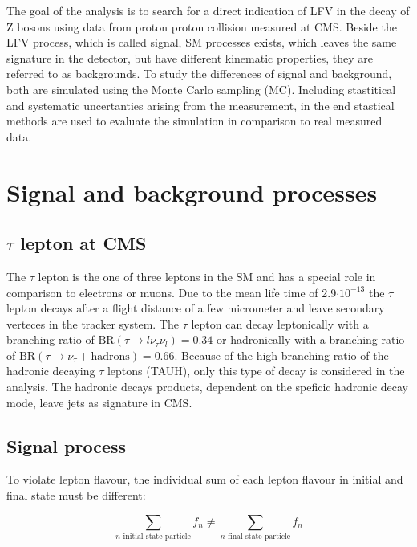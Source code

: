 The goal of the analysis is to search for a direct indication of \gls{LFV} in the decay of Z bosons using data from proton proton collision measured at \gls{CMS}. Beside the \gls{LFV} process, which is called signal, \gls{SM} processes exists, which leaves the same signature in the detector, but have different kinematic properties, they are referred to as backgrounds. To study the differences of signal and background, both are simulated using the Monte Carlo sampling (\gls{MC}). Including stastitical and systematic uncertanties arising from the measurement, in the end stastical methods are used to evaluate the simulation in comparison to real measured data. 

\section{Signal and background processes}

\subsection{$\tau$ lepton at \gls{CMS}}
\label{sec:section_3_1_1}

The $\tau$ lepton \cite{TAU} is the one of three leptons in the \gls{SM} and has a special role in comparison to electrons or muons. Due to the mean life time of 2.9$\cdot 10^{-13}$ the $\tau$ lepton decays after a flight distance of a few micrometer and leave secondary verteces in the tracker system. The $\tau$ lepton can decay leptonically with a branching ratio of $\text{BR}(\tau \to l\nu_{\tau}\nu_{l}) = 0.34$ or hadronically with a branching ratio of $\text{BR}(\tau \to \nu_{\tau} + \text{hadrons}) = 0.66$. Because of the high branching ratio of the hadronic decaying $\tau$ leptons (\gls{TAUH}), only this type of decay is considered in the analysis. The hadronic decays products, dependent on the speficic hadronic decay mode, leave jets as signature in \gls{CMS}.

\subsection{Signal process}
\label{sec:section_3_1_2}

To violate lepton flavour, the individual sum of each lepton flavour in initial and final state must be different: 

\begin{equation}
	\label{eq:eq_3_1}
	\sum_{n \text{ initial state particle}} f_{n} \neq  \sum_{n \text{ final state particle}} f_{n}
\end{equation}


